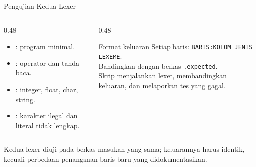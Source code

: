 \documentclass[aspectratio=169,10pt,t]{beamer}
\begin{document}
\begin{frame}{Pengujian Kedua Lexer}
  \small
  \begin{columns}[T,onlytextwidth]
    \begin{column}{0.48\textwidth}
      \begin{itemize}
        \item {}: program minimal.
        \item {}: operator dan tanda baca.
        \item {}: integer, float, char, string.
        \item {}: karakter ilegal dan literal tidak
              lengkap.
      \end{itemize}
    \end{column}
    \begin{column}{0.48\textwidth}
      \begin{block}{Format keluaran}
        \footnotesize
        Setiap baris: \texttt{BARIS:KOLOM JENIS LEXEME}.\\
        Bandingkan dengan berkas \texttt{.expected}.\\
        Skrip  menjalankan lexer, membandingkan
        keluaran, dan melaporkan tes yang gagal.
      \end{block}
    \end{column}
  \end{columns}

  \vspace{4pt}
  {\footnotesize\color{ubbblue!80}Kedua lexer diuji pada berkas
  masukan yang sama; keluarannya harus identik, kecuali perbedaan
  penanganan baris baru yang didokumentasikan.}
\end{frame}
\end{document}
